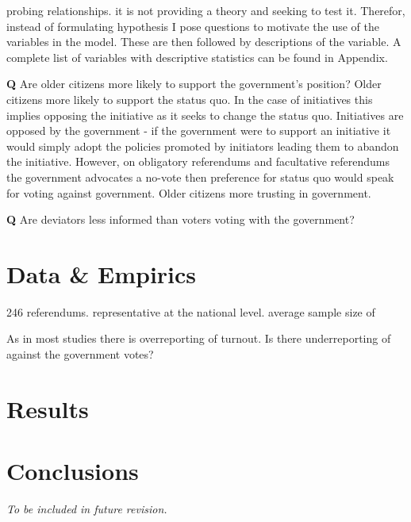 \documentclass[11pt,a4paper]{article}
\begin{document}
probing relationships. it is not providing a theory and seeking to test it. Therefor, instead of formulating hypothesis I pose questions to motivate the use of the variables in the model. These are then followed by descriptions of the variable. A complete list of variables with descriptive statistics can be found in Appendix.

\textbf{Q} Are older citizens more likely to support the government's position?
Older citizens more likely to support the status quo. In the case of initiatives this implies opposing the initiative as it seeks to change the status quo. Initiatives are opposed by the government %
- if the government were to support an initiative it would simply adopt the policies promoted by initiators leading them to abandon the initiative.
However, on obligatory referendums and facultative referendums the government advocates a no-vote %
then preference for status quo would speak for voting against government.
Older citizens more trusting in government.



\textbf{Q} Are deviators less informed than voters voting with the government?



\section{Data \& Empirics}\label{sec:data}

246 referendums. representative at the national level. average sample size of 

As in most studies there is overreporting of turnout. Is there underreporting of against the government votes?

\section{Results}\label{sec:results}

\section{Conclusions}\label{sec:conclusions}

\textit{To be included in future revision.}
\end{document}
